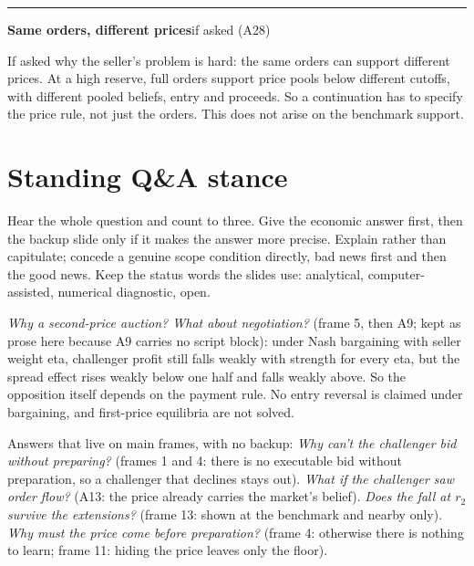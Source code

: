 \documentclass[11pt]{article}
\newcommand{\scriptframe}[3]{%
  \Needspace{9\baselineskip}%
  \par\medskip\noindent\textcolor{ScriptBlue}{\rule{\linewidth}{0.55pt}}%
  \par\smallskip\noindent
  \textbf{#1}\hfill\textcolor{ScriptGray}{\small #2}\par\smallskip
  #3\par}
\begin{document}
\scriptframe{Same orders, different prices}{if asked (A28)}{%
  If asked why the seller's problem is hard: the same orders can support
  different prices. At a high reserve, full orders support price pools below
  different cutoffs, with different pooled beliefs, entry and proceeds. So a
  continuation has to specify the price rule, not just the orders. This does not
  arise on the benchmark support.
}

\section*{Standing Q\&A stance}
Hear the whole question and count to three. Give the economic answer first,
then the backup slide only if it makes the answer more precise. Explain rather
than capitulate; concede a genuine scope condition directly, bad news first and
then the good news. Keep the status words the slides use: analytical,
computer-assisted, numerical diagnostic, open.

\textit{Why a second-price auction? What about negotiation?} (frame 5, then A9;
kept as prose here because A9 carries no script block): under Nash bargaining
with seller weight eta, challenger profit still falls weakly with strength for
every eta, but the spread effect rises weakly below one half and falls weakly
above. So the opposition itself depends on the payment rule. No entry reversal
is claimed under bargaining, and first-price equilibria are not solved.

Answers that live on main frames, with no backup: \textit{Why can't the challenger
bid without preparing?} (frames 1 and 4: there is no executable bid without
preparation, so a challenger that declines stays out). \textit{What if the
challenger saw order flow?} (A13: the price already carries the market's belief).
\textit{Does the fall at $r_2$ survive the extensions?} (frame 13: shown at the
benchmark and nearby only). \textit{Why must the price come before preparation?}
(frame 4: otherwise there is nothing to learn; frame 11: hiding the price leaves
only the floor).
\end{document}
